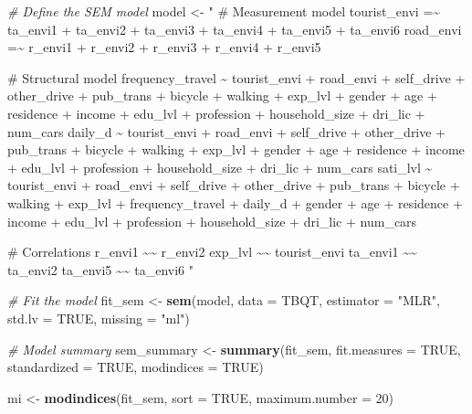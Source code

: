 \documentclass[
11pt, %
oneside, %
english, %
singlespacing, %
]{macthesis} %
\newenvironment{Shaded}{\begin{snugshade}}{\end{snugshade}}
\newcommand{\AttributeTok}[1]{\textcolor[rgb]{0.13,0.29,0.53}{#1}}
\newcommand{\CommentTok}[1]{\textcolor[rgb]{0.56,0.35,0.01}{\textit{#1}}}
\newcommand{\ConstantTok}[1]{\textcolor[rgb]{0.56,0.35,0.01}{#1}}
\newcommand{\DecValTok}[1]{\textcolor[rgb]{0.00,0.00,0.81}{#1}}
\newcommand{\FunctionTok}[1]{\textcolor[rgb]{0.13,0.29,0.53}{\textbf{#1}}}
\newcommand{\NormalTok}[1]{#1}
\newcommand{\OtherTok}[1]{\textcolor[rgb]{0.56,0.35,0.01}{#1}}
\newcommand{\StringTok}[1]{\textcolor[rgb]{0.31,0.60,0.02}{#1}}
\begin{document}
\begin{Shaded}
\begin{Highlighting}[]
\CommentTok{\# Define the SEM model}
\NormalTok{model }\OtherTok{\textless{}{-}} \StringTok{"}
\StringTok{\# Measurement model}
\StringTok{tourist\_envi =\textasciitilde{} ta\_envi1 + ta\_envi2 + ta\_envi3 + ta\_envi4 + ta\_envi5 }
\StringTok{  + ta\_envi6}
\StringTok{road\_envi =\textasciitilde{} r\_envi1 + r\_envi2 + r\_envi3 + r\_envi4 + r\_envi5}

\StringTok{\# Structural model}
\StringTok{frequency\_travel \textasciitilde{} tourist\_envi + road\_envi}
\StringTok{  + self\_drive + other\_drive + pub\_trans + bicycle + walking}
\StringTok{  + exp\_lvl}
\StringTok{  + gender + age + residence + income + edu\_lvl }
\StringTok{  + profession + household\_size + dri\_lic + num\_cars}
\StringTok{daily\_d \textasciitilde{} tourist\_envi + road\_envi}
\StringTok{  + self\_drive + other\_drive + pub\_trans + bicycle + walking}
\StringTok{  + exp\_lvl}
\StringTok{  + gender + age + residence + income + edu\_lvl }
\StringTok{  + profession + household\_size + dri\_lic + num\_cars}
\StringTok{sati\_lvl \textasciitilde{} tourist\_envi + road\_envi}
\StringTok{  + self\_drive + other\_drive + pub\_trans + bicycle + walking}
\StringTok{  + exp\_lvl}
\StringTok{  + frequency\_travel + daily\_d}
\StringTok{  + gender + age + residence + income + edu\_lvl }
\StringTok{  + profession + household\_size + dri\_lic + num\_cars}

\StringTok{\# Correlations}
\StringTok{r\_envi1 \textasciitilde{}\textasciitilde{} r\_envi2}
\StringTok{exp\_lvl \textasciitilde{}\textasciitilde{} tourist\_envi}
\StringTok{ta\_envi1 \textasciitilde{}\textasciitilde{} ta\_envi2}
\StringTok{ta\_envi5 \textasciitilde{}\textasciitilde{} ta\_envi6}
\StringTok{"}

\CommentTok{\# Fit the model}
\NormalTok{fit\_sem }\OtherTok{\textless{}{-}} \FunctionTok{sem}\NormalTok{(model, }\AttributeTok{data =}\NormalTok{ TBQT, }\AttributeTok{estimator =} \StringTok{"MLR"}\NormalTok{, }\AttributeTok{std.lv =} \ConstantTok{TRUE}\NormalTok{, }\AttributeTok{missing =} \StringTok{"ml"}\NormalTok{)}

\CommentTok{\# Model summary}
\NormalTok{sem\_summary }\OtherTok{\textless{}{-}} \FunctionTok{summary}\NormalTok{(fit\_sem, }\AttributeTok{fit.measures =} \ConstantTok{TRUE}\NormalTok{, }\AttributeTok{standardized =} \ConstantTok{TRUE}\NormalTok{, }\AttributeTok{modindices =} \ConstantTok{TRUE}\NormalTok{)}

\NormalTok{mi }\OtherTok{\textless{}{-}} \FunctionTok{modindices}\NormalTok{(fit\_sem, }\AttributeTok{sort =} \ConstantTok{TRUE}\NormalTok{, }\AttributeTok{maximum.number =} \DecValTok{20}\NormalTok{)}
\end{Highlighting}
\end{Shaded}
\end{document}
